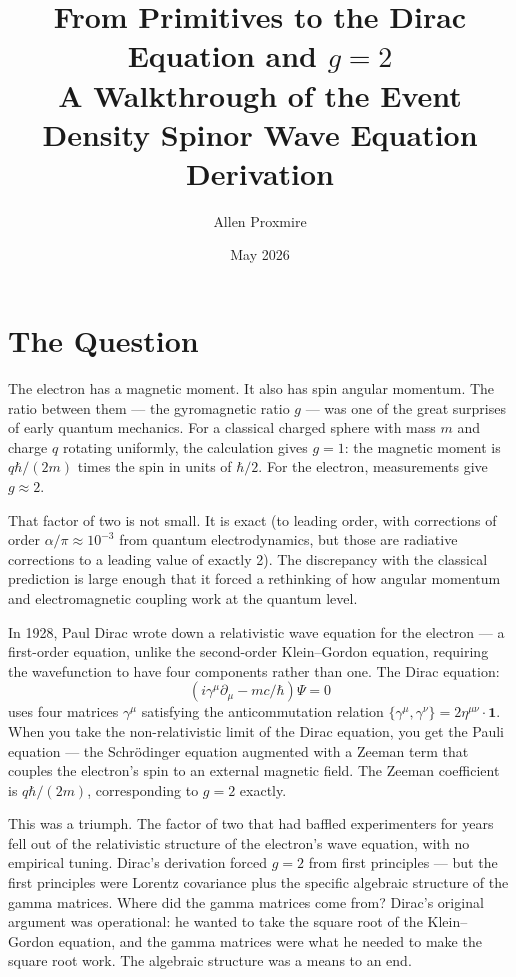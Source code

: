 \documentclass[11pt,a4paper]{article}
\title{\vspace{-1cm}\Large\bfseries From Primitives to the Dirac Equation and $g = 2$\\[6pt]
\large\mdseries A Walkthrough of the Event Density Spinor Wave Equation Derivation}
\author{Allen Proxmire}
\date{May 2026}
\begin{document}
\maketitle
\thispagestyle{empty}

\section{The Question}

The electron has a magnetic moment. It also has spin angular momentum. The ratio between them --- the gyromagnetic ratio $g$ --- was one of the great surprises of early quantum mechanics. For a classical charged sphere with mass $m$ and charge $q$ rotating uniformly, the calculation gives $g = 1$: the magnetic moment is $q\hbar/(2m)$ times the spin in units of $\hbar/2$. For the electron, measurements give $g \approx 2$.

That factor of two is not small. It is exact (to leading order, with corrections of order $\alpha/\pi \approx 10^{-3}$ from quantum electrodynamics, but those are radiative corrections to a leading value of exactly 2). The discrepancy with the classical prediction is large enough that it forced a rethinking of how angular momentum and electromagnetic coupling work at the quantum level.

In 1928, Paul Dirac wrote down a relativistic wave equation for the electron --- a first-order equation, unlike the second-order Klein--Gordon equation, requiring the wavefunction to have four components rather than one. The Dirac equation:
\[
(i\gamma^\mu \partial_\mu - mc/\hbar)\Psi = 0
\]
uses four matrices $\gamma^\mu$ satisfying the anticommutation relation $\{\gamma^\mu, \gamma^\nu\} = 2\eta^{\mu\nu}\cdot\mathbf{1}$. When you take the non-relativistic limit of the Dirac equation, you get the Pauli equation --- the Schr\"odinger equation augmented with a Zeeman term that couples the electron's spin to an external magnetic field. The Zeeman coefficient is $q\hbar/(2m)$, corresponding to $g = 2$ exactly.

This was a triumph. The factor of two that had baffled experimenters for years fell out of the relativistic structure of the electron's wave equation, with no empirical tuning. Dirac's derivation forced $g = 2$ from first principles --- but the first principles were Lorentz covariance plus the specific algebraic structure of the gamma matrices. Where did the gamma matrices come from? Dirac's original argument was operational: he wanted to take the square root of the Klein--Gordon equation, and the gamma matrices were what he needed to make the square root work. The algebraic structure was a means to an end.
\end{document}
